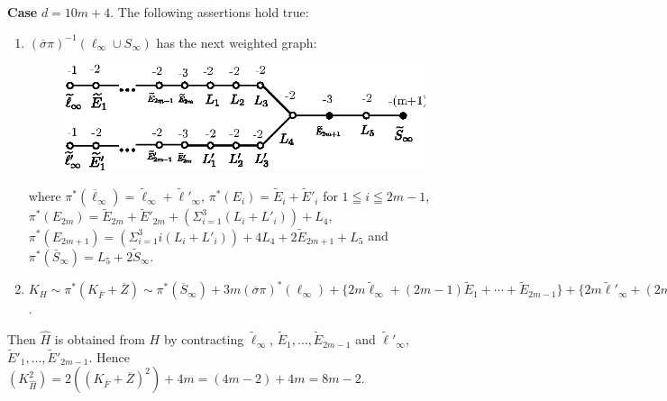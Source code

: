 \subsubsection{}\label{chap3:3.6.4}
{\bf Case} $d=10m+4$. The following assertions hold true:
\begin{enumerate}
\renewcommand{\labelenumi}{(\theenumi)}
\item $(\overline{\sigma}\pi)^{-1}(\ell_{\infty}\cup S_{\infty})$ has
  the next weighted graph:
\begin{figure}[H]
\centering
\includegraphics[scale=1.1]{figures/miyansi_fig47.eps}
\end{figure}

\noindent 
where
$\pi^{\ast}(\overline{\ell}_{\infty})=\widetilde{\ell}_{\infty}+\widetilde{\ell}'_{\infty}$,
$\pi^{\ast}(E_{i})=\widetilde{E}_{i}+\widetilde{E}'_{i}$ for $1\leqq
i\leqq 2m-1$,
$\pi^{\ast}(E_{2m})=\widetilde{E}_{2m}+\widetilde{E}'_{2m}+(\Sigma^{3}_{i=1}(L_{i}+L'_{i}))+L_{4}$,
$\pi^{\ast}(E_{2m+1})=(\Sigma^{3}_{i=1}i(L_{i}+L'_{i}))+4L_{4}+2\widetilde{E}_{2m+1}+L_{5}$
and
$\pi^{\ast}(\bar{S}_{\infty})=L_{5}+2\widetilde{S}_{\infty}$.

\item
  $K_{H}\sim\pi^{\ast}(K_{\overline{F}}+\overline{Z})\sim\pi^{\ast}(\overline{S}_{\infty})+3m(\overline{\sigma}\pi)^{\ast}(\ell_{\infty})+\{2m\widetilde{\ell}_{\infty}+(2m-1)\widetilde{E}_{1}+\cdots+\widetilde{E}_{2m-1}\}+\{2m\widetilde{\ell}'_{\infty}+(2m-1)\widetilde{E}'_{1}+\cdots+\widetilde{E}'_{2m-1}\}$. 
\end{enumerate}

Then $\widehat{H}$ is obtained from $H$ by contracting
$\widetilde{\ell}_{\infty}$,
$\widetilde{E}_{1},\ldots,\widetilde{E}_{2m-1}$ and
$\widetilde{\ell}'_{\infty}$,
$\widetilde{E}'_{1},\ldots,\widetilde{E}'_{2m-1}$. Hence
$(K^{2}_{\widehat{H}})=2((K_{\overline{F}}+\overline{Z})^{2})+4m=(4m-2)+4m=8m-2$. 

